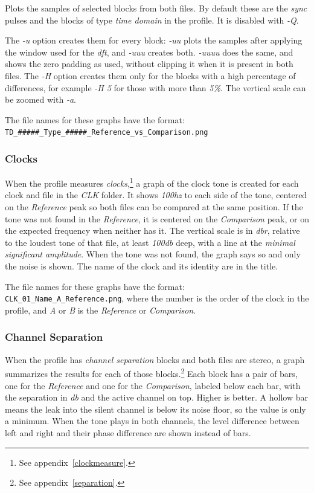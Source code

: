 \documentclass[10pt,a4paper]{report}
\newcommand{\ac}[1]{\textit{\mbox{\acrshort{#1}}}}
\newcommand{\hz}[1]{\textit{\mbox{#1\acrshort{hz}}}}
\newcommand{\db}[1]{\textit{\mbox{#1\acrshort{db}}}}
\begin{document}
\begin{appendices}
Plots the samples of selected blocks from both files. By default these are the \textit{sync} pulses and the blocks of type \textit{time domain} in the profile. It is disabled with \textit{-Q}.

The \textit{-u} option creates them for every block: \textit{-uu} plots the samples after applying the window used for the \ac{dft}, and \textit{-uuu} creates both. \textit{-uuuu} does the same, and shows the zero padding as used, without clipping it when it is present in both files. The \textit{-H} option creates them only for the blocks with a high percentage of differences, for example \textit{-H 5} for those with more than \textit{5\%}. The vertical scale can be zoomed with \textit{-a}.

The file names for these graphs have the format:\\ \nolinkurl{TD_#####_Type_#####_Reference_vs_Comparison.png}

\subsubsection{Clocks}

When the profile measures \textit{clocks},\footnote{See appendix~\ref{clockmeasure}.} a graph of the clock tone is created for each clock and file in the \textit{CLK} folder. It shows \hz{100} to each side of the tone, centered on the \textit{Reference} peak so both files can be compared at the same position. If the tone was not found in the \textit{Reference}, it is centered on the \textit{Comparison} peak, or on the expected frequency when neither has it. The vertical scale is in \ac{dbr}, relative to the loudest tone of that file, at least \db{100} deep, with a line at the \textit{minimal significant amplitude}. When the tone was not found, the graph says so and only the noise is shown. The name of the clock and its identity are in the title.

The file names for these graphs have the format:\\ \nolinkurl{CLK_01_Name_A_Reference.png}, where the number is the order of the clock in the profile, and \textit{A} or \textit{B} is the \textit{Reference} or \textit{Comparison}.

\subsubsection{Channel Separation}

When the profile has \textit{channel separation} blocks and both files are stereo, a graph summarizes the results for each of those blocks.\footnote{See appendix~\ref{separation}.} Each block has a pair of bars, one for the \textit{Reference} and one for the \textit{Comparison}, labeled below each bar, with the separation in \ac{db} and the active channel on top. Higher is better. A hollow bar means the leak into the silent channel is below its noise floor, so the value is only a minimum. When the tone plays in both channels, the level difference between left and right and their phase difference are shown instead of bars.


\end{appendices}
\end{document}
